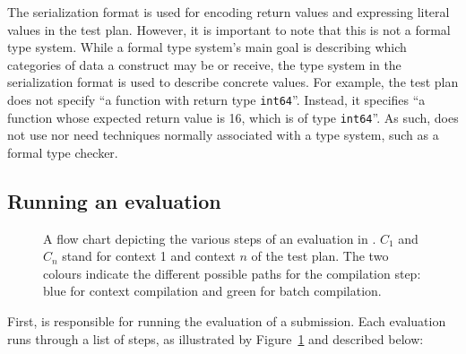 \documentclass[5p,number]{elsarticle}
\begin{document}
    The serialization format is used for encoding return values and expressing literal values in the test plan.
    However, it is important to note that this is not a formal type system.
    While a formal type system's main goal is describing which categories of data a construct may be or receive, the type system in the serialization format is used to describe concrete values.
    For example, the test plan does not specify ``a function with return type \texttt{int64}''.
    Instead, it specifies ``a function whose expected return value is 16, which is of type \texttt{int64}''.
    As such, \tested{} does not use nor need techniques normally associated with a type system, such as a formal type checker.

    \subsection{Running an evaluation}\label{subsec:running-an-evaluation}

    \begin{figure}
        \centering
        
        \caption{
        A flow chart depicting the various steps of an evaluation in \tested{}.
        $C_1$ and $C_n$ stand for context 1 and context $n$ of the test plan.
        The two colours indicate the different possible paths for the compilation step: blue for context compilation and green for batch compilation.
        }
        \label{fig:tested-flow}
    \end{figure}

    First, \tested{} is responsible for running the evaluation of a submission.
    Each evaluation runs through a list of steps, as illustrated by Figure~\ref{fig:tested-flow} and described below:
\end{document}
